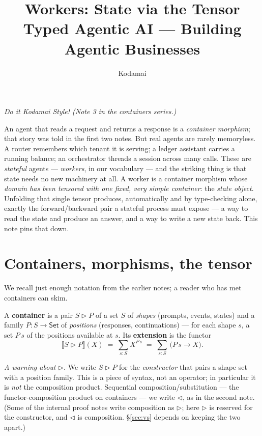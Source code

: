\documentclass[11pt]{article}
\title{\textbf{Workers: State via the Tensor}\\[2pt]
  \large Typed Agentic AI --- Building Agentic Businesses}
\author{Kodamai}
\date{}
\newcommand{\ctr}{\mathbin{\triangleright}}      %
\newcommand{\ext}[1]{\llbracket #1 \rrbracket}    %
\newcommand{\comp}{\mathbin{\triangleleft}}       %
\newcommand{\Set}{\mathsf{Set}}
\theoremstyle{plain}
\theoremstyle{definition}
\begin{document}
\maketitle
\vspace{-2.5em}
\begin{center}\itshape Do it Kodamai Style! \quad(Note 3 in the containers series.)\end{center}
\vspace{1em}

An agent that reads a request and returns a response is a \emph{container morphism}; that story
was told in the first two notes. But real agents are rarely memoryless. A router remembers which
tenant it is serving; a ledger assistant carries a running balance; an orchestrator threads a
session across many calls. These are \emph{stateful} agents --- \emph{workers}, in our vocabulary
--- and the striking thing is that state needs no new machinery at all. A worker is a container
morphism whose \emph{domain has been tensored with one fixed, very simple container}: the
\emph{state object}. Unfolding that single tensor produces, automatically and by type-checking
alone, exactly the forward/backward pair a stateful process must expose --- a way to read the
state and produce an answer, and a way to write a new state back. This note pins that down.

\section{Containers, morphisms, the tensor}\label{sec:recap}

We recall just enough notation from the earlier notes; a reader who has met containers can skim.

\begin{defbox}[A container]
A \textbf{container} is a pair $S \ctr P$ of a set $S$ of \emph{shapes} (prompts, events, states)
and a family $P : S \to \Set$ of \emph{positions} (responses, continuations) --- for each shape
$s$, a set $P\,s$ of the positions available at $s$. Its \textbf{extension} is the functor
\[
  \ext{S \ctr P}(X) \;=\; \textstyle\sum_{s : S} X^{P\,s}
  \;=\; \textstyle\sum_{s:S}\, \big(P\,s \to X\big).
\]
\end{defbox}

\noindent\emph{A warning about $\ctr$.} We write $S \ctr P$ for the \emph{constructor} that pairs a
shape set with a position family. This is a piece of syntax, not an operator; in particular it is
\emph{not} the composition product. Sequential composition/substitution --- the functor-composition
product on containers --- we write $\comp$, as in the second note. (Some of the internal proof notes
write composition as $\triangleright$; here $\triangleright$ is reserved for the constructor, and
$\comp$ is composition. \S\ref{sec:vs} depends on keeping the two apart.)
\end{document}
